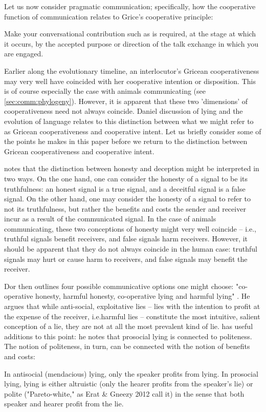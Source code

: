 Let us now consider pragmatic communication; specifically, how the cooperative function of communication relates to Grice's cooperative principle:
\begin{quoting}
    Make your conversational contribution such as is required, at the stage at which it occurs, by the accepted purpose or direction of the talk exchange in which you are engaged.
    \hfill \citep[p.~45]{Grice75}
\end{quoting}
Earlier along the evolutionary timeline, an interlocutor's Gricean cooperativeness may very well have coincided with her cooperative intention or disposition. This is of course especially the case with animals communicating (see \cref{sec:comm:phylogeny}).
However, it is apparent that these two 'dimensions' of cooperativeness need not always coincide.
Daniel  discussion of lying and the evolution of language relates to this distinction between what we might refer to as Gricean cooperativeness and cooperative intent. Let us briefly consider some of the points he makes in this paper before we return to the distinction between Gricean cooperativeness and cooperative intent.

\citet{Dor17} notes that the distinction between honesty and deception might be interpreted in two ways. On the one hand, one can consider the honesty of a signal to be its truthfulness: an honest signal is a true signal, and a deceitful signal is a false signal. On the other hand, one may consider the honesty of a signal to refer to not its truthfulness, but rather the benefits and costs the sender and receiver incur as a result of the communicated signal. In the case of animals communicating, these two conceptions of honesty might very well coincide -- i.e., truthful signals benefit receivers, and false signals harm receivers. However, it should be apparent that they do not always coincide in the human case: truthful signals may hurt or cause harm to receivers, and false signals may benefit the receiver. 

Dor then outlines four possible communicative options one might choose: "co-operative honesty, harmful honesty, co-operative lying and harmful lying" \citep[p.~45]{Dor17}.
He argues that while anti-social, exploitative lies -- lies with the intention to profit at the expense of the receiver, i.e.\@ harmful lies -- constitute the most intuitive, salient conception of a lie, they are not at all the most prevalent kind of lie. \citet{Meibauer18} has useful additions to this point: he notes that prosocial lying is connected to politeness. The notion of politeness, in turn, can be connected with the notion of benefits and costs:
\begin{quoting}
    In antisocial (mendacious) lying, only the speaker profits from lying. In prosocial lying, lying is either altruistic (only the hearer profits from the speaker's lie) or polite ("Pareto-white," as Erat \& Gneezy 2012 call it) in the sense that both speaker and hearer profit from the lie.
    \hfill \citep[p.~371]{Meibauer18}
\end{quoting}

